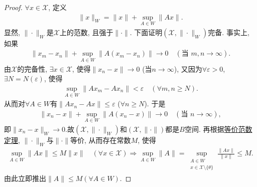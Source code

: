 \documentclass[../../main.tex]{subfiles}%
\begin{document}
\begin{proof}
$\forall x\in\mathscr{X}$, 定义
\begin{align*}
\|x\|_W = \|x\| + \sup_{A\in W}\|Ax\|.
\end{align*}
显然, $\|\cdot\|_W$是$\mathscr{X}$上的范数, 且强于$\|\cdot\|$. 下面证明$(\mathscr{X},\|\cdot\|_W)$完备. 事实上, 如果
\begin{align*}
\|x_m - x_n\| + \sup_{A\in W}\|A(x_m - x_n)\| \to 0 \quad (\text{当 }m,n\to\infty).
\end{align*}
由$\mathscr{X}$的完备性, $\exists x\in\mathscr{X}$, 使得$\|x_n - x\|\to 0$ (当$n\to\infty$), 又因为$\forall\varepsilon>0$, $\exists N=N(\varepsilon)$, 使得
\begin{align*}
\sup_{A\in W}\|Ax_m - Ax_n\| < \varepsilon \quad (\forall m,n\geqslant N).
\end{align*}
从而对$\forall A\in W$有$\|Ax_n - Ax\|\leqslant\varepsilon$ ($\forall n\geqslant N$). 于是
\begin{align*}
\|x_n - x\| + \sup_{A\in W}\|A(x_n - x)\| \to 0 \quad (\text{当 }n\to\infty),
\end{align*}
即$\|x_n - x\|_W\to 0$.故$(\mathscr{X},\|\cdot\|_W)$和$(\mathscr{X},\|\cdot\|)$都是$B$空间. 再根据\hyperref[corollary:泛函分析--等价范数定理]{等价范数定理}, $\|\cdot\|_W$与$\|\cdot\|$等价, 从而存在常数$M$, 使得
\begin{align*}
\sup\limits_{A\in W}\|Ax\| \leqslant M\|x\| \quad (\forall x\in \mathscr{X}) \Longrightarrow \sup\limits_{A\in W}\|A\| = \sup\limits_{\substack{A\in W\\ x\in \mathscr{X} \setminus \{ \theta \}}}\frac{\|Ax\|}{\|x\|} \leqslant M.
\end{align*}
由此立即推出$\|A\|\leqslant M(\forall A\in W)$.
\end{proof}
\end{document}
